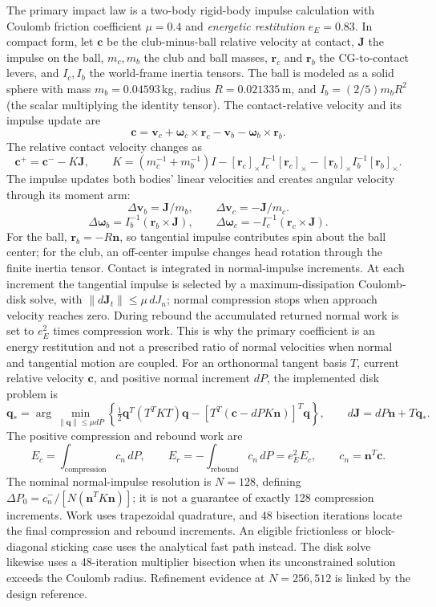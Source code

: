 \documentclass[11pt,letterpaper]{article}
\begin{document}
The primary impact law is a two-body rigid-body impulse calculation with
Coulomb friction coefficient $\mu=0.4$ and \emph{energetic restitution}
$e_E=0.83$. In compact form, let $\mathbf c$ be the club-minus-ball relative
velocity at contact, $\mathbf J$ the impulse on the ball, $m_c,m_b$ the club
and ball masses, $\mathbf r_c$ and $\mathbf r_b$ the CG-to-contact levers,
and $I_c,I_b$ the world-frame inertia tensors. The ball is modeled as a solid
sphere with mass $m_b=0.04593$\,kg, radius $R=0.021335$\,m, and
$I_b=(2/5)m_bR^2$ (the scalar multiplying the identity tensor).
The contact-relative velocity and its impulse update are
\[
 \mathbf c=\mathbf v_c+\boldsymbol\omega_c\times\mathbf r_c
             -\mathbf v_b-\boldsymbol\omega_b\times\mathbf r_b.
\]
The relative contact velocity changes as
\[
 \mathbf c^+=\mathbf c^- - K\mathbf J,\qquad
 K=\left(m_c^{-1}+m_b^{-1}\right)I
 -[\mathbf r_c]_\times I_c^{-1}[\mathbf r_c]_\times
 -[\mathbf r_b]_\times I_b^{-1}[\mathbf r_b]_\times.
\]
The impulse updates both bodies' linear velocities and creates angular
velocity through its moment arm:
\[
 \Delta\mathbf v_b=\mathbf J/m_b,\qquad
 \Delta\mathbf v_c=-\mathbf J/m_c.
\]
\[
 \Delta\boldsymbol\omega_b=I_b^{-1}(\mathbf r_b\times\mathbf J),\qquad
 \Delta\boldsymbol\omega_c=-I_c^{-1}(\mathbf r_c\times\mathbf J).
\]
For the ball, $\mathbf r_b=-R\mathbf n$, so tangential impulse contributes
spin about the ball center; for the club, an off-center impulse changes head
rotation through the finite inertia tensor. Contact is integrated in
normal-impulse increments. At each increment the tangential
impulse is selected by a maximum-dissipation Coulomb-disk solve, with
$\|d\mathbf J_t\|\leq\mu\,dJ_n$; normal compression stops when approach
velocity reaches zero. During rebound the accumulated returned normal work
is set to $e_E^2$ times compression work. This is why the primary coefficient
is an energy restitution and not a prescribed ratio of normal velocities when
normal and tangential motion are coupled.
For an orthonormal tangent basis $T$, current relative velocity $\mathbf c$,
and positive normal increment $dP$, the implemented disk problem is
\[
 \mathbf q_* =\arg\min_{\|\mathbf q\|\le\mu dP}
 \left\{\tfrac12\mathbf q^T(T^TKT)\mathbf q
 -[T^T(\mathbf c-dP K\mathbf n)]^T\mathbf q\right\},\qquad
 d\mathbf J=dP\mathbf n+T\mathbf q_*.
\]
The positive compression and rebound work are
\[
 E_c=\int_{\mathrm{compression}}c_n\,dP,\qquad
 E_r=-\int_{\mathrm{rebound}}c_n\,dP=e_E^2 E_c,
 \qquad c_n=\mathbf n^T\mathbf c.
\]
The nominal normal-impulse resolution is $N=128$, defining
$\Delta P_0=c_n^-/[N(\mathbf n^TK\mathbf n)]$; it is not a guarantee of
exactly 128 compression increments. Work uses trapezoidal quadrature, and
48 bisection iterations locate the final compression and rebound increments.
An eligible frictionless or block-diagonal sticking case uses the analytical
fast path instead. The disk solve likewise uses a 48-iteration multiplier
bisection when its unconstrained solution exceeds the Coulomb radius.
Refinement evidence at $N=256,512$ is linked by the design reference.
\end{document}
